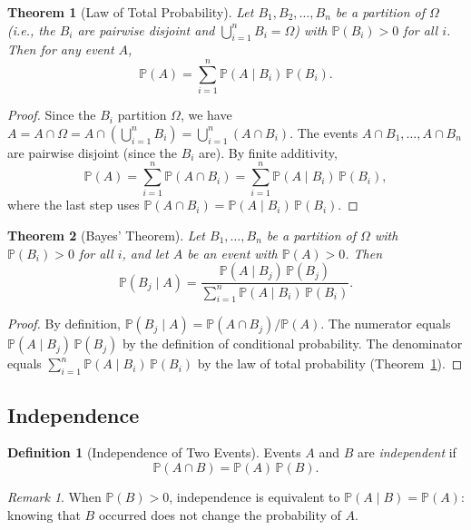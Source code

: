 \documentclass[11pt,a4paper]{article}
\theoremstyle{definition}
\newtheorem{definition}{Definition}[section]
\theoremstyle{plain}
\newtheorem{theorem}{Theorem}[section]
\theoremstyle{remark}
\newtheorem{remark}{Remark}[section]
\newcommand{\Prob}{\mathbb{P}}
\begin{document}
\begin{theorem}[Law of Total Probability]
\label{thm:total_prob}
Let $B_1, B_2, \ldots, B_n$ be a partition of $\Omega$ (i.e., the $B_i$ are pairwise
disjoint and $\bigcup_{i=1}^n B_i = \Omega$) with $\Prob(B_i) > 0$ for all $i$. Then for
any event $A$,
\[
    \Prob(A) = \sum_{i=1}^n \Prob(A \mid B_i)\,\Prob(B_i).
\]
\end{theorem}

\begin{proof}
Since the $B_i$ partition $\Omega$, we have $A = A \cap \Omega = A \cap
\left(\bigcup_{i=1}^n B_i\right) = \bigcup_{i=1}^n (A \cap B_i)$. The events
$A \cap B_1, \ldots, A \cap B_n$ are pairwise disjoint (since the $B_i$ are). By
finite additivity,
\[
    \Prob(A) = \sum_{i=1}^n \Prob(A \cap B_i) = \sum_{i=1}^n \Prob(A \mid B_i)\,\Prob(B_i),
\]
where the last step uses $\Prob(A \cap B_i) = \Prob(A \mid B_i)\,\Prob(B_i)$.
\end{proof}

\begin{theorem}[Bayes' Theorem]
\label{thm:bayes}
Let $B_1, \ldots, B_n$ be a partition of $\Omega$ with $\Prob(B_i) > 0$ for all $i$, and
let $A$ be an event with $\Prob(A) > 0$. Then
\[
    \Prob(B_j \mid A) = \frac{\Prob(A \mid B_j)\,\Prob(B_j)}{\sum_{i=1}^n \Prob(A \mid B_i)\,\Prob(B_i)}.
\]
\end{theorem}

\begin{proof}
By definition, $\Prob(B_j \mid A) = \Prob(A \cap B_j)/\Prob(A)$. The numerator equals
$\Prob(A \mid B_j)\,\Prob(B_j)$ by the definition of conditional probability. The
denominator equals $\sum_{i=1}^n \Prob(A \mid B_i)\,\Prob(B_i)$ by the law of total
probability (Theorem~\ref{thm:total_prob}).
\end{proof}

\subsection{Independence}

\begin{definition}[Independence of Two Events]
\label{def:indep_two}
Events $A$ and $B$ are \emph{independent} if
\[
    \Prob(A \cap B) = \Prob(A)\,\Prob(B).
\]
\end{definition}

\begin{remark}
When $\Prob(B) > 0$, independence is equivalent to $\Prob(A \mid B) = \Prob(A)$: knowing
that $B$ occurred does not change the probability of $A$.
\end{remark}
\end{document}
